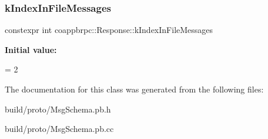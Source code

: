 \subsubsection{\texorpdfstring{k\+Index\+In\+File\+Messages}{kIndexInFileMessages}}
{\footnotesize\ttfamily constexpr int coappbrpc\+::\+Response\+::k\+Index\+In\+File\+Messages\hspace{0.3cm}{\ttfamily [static]}}

{\bfseries Initial value\+:}
\begin{DoxyCode}
=
    2
\end{DoxyCode}


The documentation for this class was generated from the following files\+:\begin{DoxyCompactItemize}
\item 
build/proto/Msg\+Schema.\+pb.\+h\item 
build/proto/Msg\+Schema.\+pb.\+cc\end{DoxyCompactItemize}
